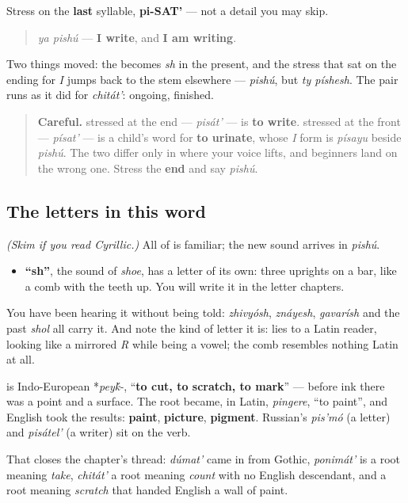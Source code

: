 Stress on the \textbf{last} syllable, \textbf{pi-SAT'} — not a detail you may skip.

\begin{quote}
\emph{ya pishú} — \textbf{I write}, and \textbf{I am writing}.
\end{quote}

Two things moved: the \textbf{} becomes \emph{sh} in the present, and the stress that sat on the ending for \emph{I} jumps back to the stem elsewhere — \emph{pishú}, but \emph{ty píshesh}. The pair runs as it did for \emph{chitát'}: \textbf{} ongoing, \textbf{} finished.

\begin{quote}
\textbf{Careful.} \emph{} stressed at the end — \emph{pisát'} — is \textbf{to write}. \emph{} stressed at the front — \emph{písat'} — is a child's word for \textbf{to urinate}, whose \emph{I} form is \emph{písayu} beside \emph{pishú}. The two differ only in where your voice lifts, and beginners land on the wrong one. Stress the \textbf{end} and say \emph{pishú}.
\end{quote}

\subsection*{The letters in this word}
\emph{(Skim if you read Cyrillic.)} All of \textbf{} is familiar; the new sound arrives in \emph{pishú}.

\begin{itemize}
\raggedright
  \item \textbf{\textquotedblleft{}sh\textquotedblright{}}, the sound of \emph{shoe}, has a letter of its own: three uprights on a bar, like a comb with the teeth up. You will write it in the letter chapters.
\end{itemize}

You have been hearing it without being told: \emph{zhivyósh}, \emph{znáyesh}, \emph{gavarísh} and the past \emph{shol} all carry it. And note the kind of letter it is: \textbf{} lies to a Latin reader, looking like a mirrored \emph{R} while being a vowel; the comb resembles nothing Latin at all.

\begin{cousinweb}
\textbf{} is Indo-European *\emph{pey\'{k}-}, \textquotedblleft{}\textbf{to cut, to scratch, to mark}\textquotedblright{} — before ink there was a point and a surface. The root became, in Latin, \emph{pingere}, \textquotedblleft{}to paint\textquotedblright{}, and English took the results: \textbf{paint}, \textbf{picture}, \textbf{pigment}. Russian's \emph{pis'mó} (a letter) and \emph{pisátel'} (a writer) sit on the verb.

That closes the chapter's thread: \emph{dúmat'} came in from Gothic, \emph{ponimát'} is a root meaning \emph{take}, \emph{chitát'} a root meaning \emph{count} with no English descendant, and \textbf{} a root meaning \emph{scratch} that handed English a wall of paint.
\end{cousinweb}

